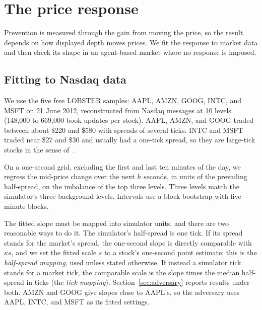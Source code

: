 \documentclass{article}
\begin{document}
\section{The price response}\label{sec:calibration}

Prevention is measured through the gain from moving the price, so the result depends on how displayed depth moves prices. We fit the response to market data and then check its shape in an agent-based market where no response is imposed.

\subsection{Fitting to Nasdaq data}

We use the five free LOBSTER samples: AAPL, AMZN, GOOG, INTC, and MSFT on 21 June 2012, reconstructed from Nasdaq messages at 10 levels (148,000 to 669,000 book updates per stock). AAPL, AMZN, and GOOG traded between about \$220 and \$580 with spreads of several ticks. INTC and MSFT traded near \$27 and \$30 and usually had a one-tick spread, so they are large-tick stocks in the sense of~\cite{r31}.

On a one-second grid, excluding the first and last ten minutes of the day, we regress the mid-price change over the next $h$ seconds, in units of the prevailing half-spread, on the imbalance of the top three levels. Three levels match the simulator's three background levels. Intervals use a block bootstrap with five-minute blocks.

The fitted slope must be mapped into simulator units, and there are two reasonable ways to do it. The simulator's half-spread is one tick. If its spread stands for the market's spread, the one-second slope is directly comparable with $\kappa s$, and we set the fitted scale $s$ to a stock's one-second point estimate; this is the \emph{half-spread mapping}, used unless stated otherwise. If instead a simulator tick stands for a market tick, the comparable scale is the slope times the median half-spread in ticks (the \emph{tick mapping}). Section~\ref{sec:adversary} reports results under both. AMZN and GOOG give slopes close to AAPL's, so the adversary uses AAPL, INTC, and MSFT as its fitted settings.
\end{document}
